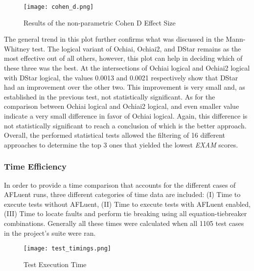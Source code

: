 \begin{figure}[!htb]
	\begin{center}
		\texttt{[image: cohen\_d.png]}
        \caption{\label{fig:cohen_d} Results of the non-parametric Cohen D
        Effect Size}
	\end{center}
\end{figure}

The general trend in this plot further confirms what was discussed in the
Mann-Whitney test. The logical variant of Ochiai, Ochiai2, and DStar remains as
the most effective out of all others, however, this plot can help in deciding
which of these three was the best. At the intersections of Ochiai logical and
Ochiai2 logical with DStar logical, the values 0.0013 and 0.0021 respectively
show that DStar had an improvement over the other two. This improvement is very
small and, as established in the previous test, not statistically significant.
As for the comparison between Ochiai logical and Ochiai2 logical, and even
smaller value indicate a very small difference in favor of Ochiai logical.
Again, this difference is not statistically significant to reach a conclusion of
which is the better approach. Overall, the performed statistical tests allowed
the filtering of 16 different approaches to determine the top 3 ones that
yielded the lowest \emph{EXAM} scores.

\subsubsection{Time Efficiency}
\label{subsubsec:time_Efficiency}

In order to provide a time comparison that accounts for the different cases of
AFLuent runs, three different categories of time data are included: (I) Time to
execute tests without AFLuent, (II) Time to execute tests with AFLuent enabled,
(III) Time to locate faults and perform tie breaking using all
equation-tiebreaker combinations. Generally all these times were calculated when
all 1105 test cases in the project's suite were ran.

\begin{figure}[!htb]
	\begin{center}
		\texttt{[image: test\_timings.png]}
		\caption{\label{fig:test_timings} Test Execution Time}
	\end{center}
\end{figure}

